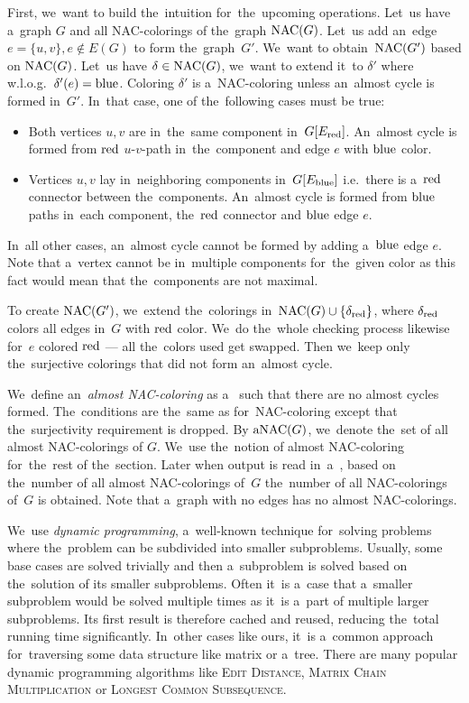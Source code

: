 First, we~want to build the~intuition for~the~upcoming operations.
Let~us have a~graph \( G \) and all NAC-colorings of the~graph \( \operatorname{NAC}(G) \).
Let~us add an~edge \( e = \{u, v\}, e \not\in E(G) \) to form the~graph~\( G' \).
We~want to obtain~\( \operatorname{NAC}(G') \) based on \( \operatorname{NAC}(G) \).
%
Let~us have \( \delta \in \operatorname{NAC}(G) \),
we~want to extend it~to \( \delta' \) where w.l.o.g.\ \( \delta'(e) = \text{blue} \).
Coloring \( \delta' \) is a~NAC-coloring unless an~almost cycle is formed in~\( G' \).
In~that case, one of the~following cases must be true:
%
\begin{itemize}
	\item Both vertices \( u, v \) are in~the~same component in~\( G[E_\text{red}] \).
	      An~almost cycle is formed
	      from \( \text{red} \) \( u \)-\( v \)-path in~the~component
	      and edge \( e \) with \( \text{blue} \) color.
	\item Vertices \( u, v \) lay in~neighboring components in~\( G[E_\text{blue}] \)
	      i.e.\ there is a~\( \text{red} \) connector between the~components.
	      An~almost cycle is formed from \( \text{blue} \) paths in~each component,
	      the~\( \text{red} \) connector and \( \text{blue} \) edge \( e \).
\end{itemize}
%
In~all other cases, an~almost cycle cannot be formed by adding a~\( \text{blue} \) edge \( e \).
Note that a~vertex cannot be in~multiple components for~the~given color
as this fact would mean that the~components are not maximal.

To create \( \operatorname{NAC}(G') \), we~extend the~colorings
in~\( \operatorname{NAC}(G) \cup \{ \delta_{\text{red}} \} \), where \( \delta_{\text{red}} \)
colors all edges in~\( G \) with \( \text{red} \) color.
We~do the~whole checking process likewise
for~\( e \) colored \( \text{red} \) --- all the~colors used get swapped.
Then we~keep only the~surjective colorings that did not form an~almost cycle.

We~define an~\emph{almost NAC-coloring}
as a~\rbcol{} such that there are no almost cycles formed.
The~conditions are the~same as for~NAC-coloring
except that the~surjectivity requirement is dropped.
By \( \operatorname{aNAC}(G) \), we~denote the~set of all almost NAC-colorings of \( G \).
We~use the~notion of almost NAC-coloring for~the~rest of the~section.
Later when output is read in~a~\RootNode{},
based on the~number of all almost NAC-colorings of~\( G \)
the~number of all NAC-colorings of~\( G \) is obtained.
Note that a~graph with no edges has no almost NAC-colorings.

We~use \emph{dynamic programming}, a~well-known technique for~solving problems
where the~problem can be subdivided into smaller subproblems.
Usually, some base cases are solved trivially and then a~subproblem
is solved based on the~solution of its smaller subproblems.
%
Often it~is a~case that a~smaller subproblem would be solved multiple times
as it~is a~part of multiple larger subproblems.
Its first result is therefore cached and reused,
reducing the~total running time significantly.
%
In~other cases like ours, it~is a~common approach for~traversing
some data structure like matrix or a~tree.
%
There are many popular dynamic programming algorithms
like \textsc{Edit Distance}, \textsc{Matrix Chain Multiplication} or \textsc{Longest Common Subsequence}.

